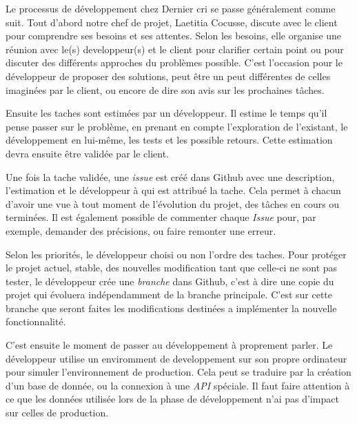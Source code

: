 \documentclass[12pt,a4paper]{article}
\begin{document}
  \bigskip

  Le processus de développement chez Dernier cri se passe généralement
  comme suit. Tout d'abord notre chef de projet, Laetitia Cocusse, discute
  avec le client pour comprendre ses besoins et ses attentes. Selon les
  besoins, elle organise une réunion avec le(s) developpeur(s) et le
  client pour clarifier certain point ou pour discuter des différents
  approches du problèmes possible. C'est l'occasion pour le développeur de
  proposer des solutions, peut être un peut différentes de celles
  imaginées par le client, ou encore de dire son avis sur les prochaines
  tâches.

  \bigskip

  Ensuite les taches sont estimées par un développeur. Il estime le temps
  qu'il pense passer sur le problème, en prenant en compte l'exploration
  de l'existant, le développement en lui-même, les tests et les possible
  retours. Cette estimation devra ensuite être validée par le client.

  \bigskip

  Une fois la tache validée, une \emph{issue} est créé dans Github avec
  une description, l'estimation et le développeur à qui est attribué la
  tache. Cela permet à chacun d'avoir une vue à tout moment de l'évolution
  du projet, des tâches en cours ou terminées. Il est également possible
  de commenter chaque \emph{Issue} pour, par exemple, demander des
  précisions, ou faire remonter une erreur.

  \bigskip

  Selon les priorités, le développeur choisi ou non l'ordre des taches.
  Pour protéger le projet actuel, stable, des nouvelles modification tant
  que celle-ci ne sont pas tester, le développeur crée une \emph{branche}
  dans Github, c'est à dire une copie du projet qui évoluera
  indépendamment de la branche principale. C'est sur cette branche que
  seront faites les modifications destinées a implémenter la nouvelle
  fonctionnalité.

  \bigskip

  C'est ensuite le moment de passer au développement à proprement parler.
  Le développeur utilise un enviromment de developpement sur son propre
  ordinateur pour simuler l'environnement de production. Cela peut se
  traduire par la création d'un base de donnée, ou la connexion à une
  \emph{API} spéciale. Il faut faire attention à ce que les données
  utilisée lors de la phase de développement n'ai pas d'impact sur celles
  de production.
\end{document}
